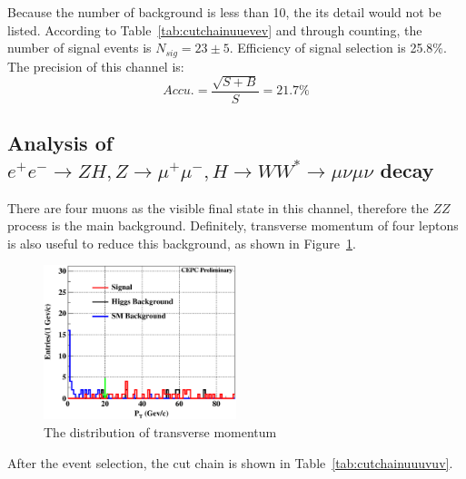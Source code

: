 \documentclass[11pt,a4paper]{cepcnote}
\begin{document}
Because the number of background is less than 10, the its detail would not be listed.
According to Table~\ref{tab:cutchainuuevev} and through counting, the number of signal events is $N_{sig} = 23\pm 5$. 
Efficiency of signal selection is 25.8\%. The precision of this channel is:
\begin{equation*}
	Accu. = \frac{\sqrt{S+B}}{S} = 21.7\%
\end{equation*}

\subsection{Analysis of $e^+e^- \to ZH, Z \to \mu^+\mu^-, H\to WW^* \to \mu\nu \mu\nu$ decay}
There are four muons as the visible final state in this channel, therefore the $ZZ$ process is the main background. 
Definitely, transverse momentum of four leptons is also useful to reduce this background, as shown in Figure~\ref{fig:ptinuuuvuv}.
\begin{figure}[H]
	\centering
	\includegraphics[width=0.5\textwidth]{e2e2H/uvuv/ptinuuuvuv}
	\caption[]{The distribution of transverse momentum}
	\label{fig:ptinuuuvuv}
\end{figure}
After the event selection, the cut chain is shown in Table~\ref{tab:cutchainuuuvuv}.
\end{document}
